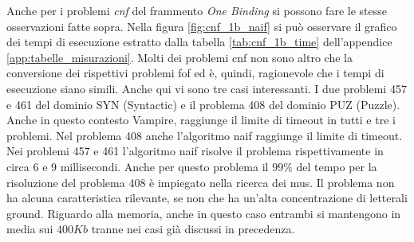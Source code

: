 \documentclass[./main.tex]{subfiles}
\begin{document}


Anche per i problemi \textit{cnf} del frammento \textit{One Binding} si possono fare le stesse osservazioni fatte sopra.
Nella figura \ref{fig:cnf_1b_naif} si può osservare il grafico dei tempi di esecuzione estratto dalla tabella \ref{tab:cnf_1b_time} dell'appendice \ref{app:tabelle_misurazioni}.
Molti dei problemi cnf non sono altro che la conversione dei rispettivi problemi fof ed è, quindi, ragionevole
che i tempi di esecuzione siano simili.
Anche qui vi sono tre casi interessanti. 
I due problemi 457 e 461 del dominio SYN (Syntactic) e il problema 408 del dominio PUZ (Puzzle). 
Anche in questo contesto Vampire, raggiunge il limite di timeout in tutti e tre i problemi.
Nel problema 408 anche l'algoritmo naif raggiunge il limite di timeout.
Nei problemi 457 e 461 l'algoritmo naif risolve il problema rispettivamente in circa 6 e 9 millisecondi.
Anche per questo problema il $99\%$ del tempo per la risoluzione del problema 408 è impiegato nella ricerca dei mus.
Il problema non ha alcuna caratteristica rilevante, se non che ha un'alta concentrazione di letterali ground.
Riguardo alla memoria, anche in questo caso entrambi si mantengono in media sui $400Kb$ tranne nei casi già discussi in precedenza.


\end{document}
